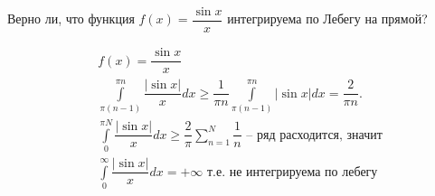 \begin{task}{3}
Верно ли, что функция $f(x) = \dfrac{\sin{x}}{x}$ интегрируема по Лебегу на прямой?
\end{task}

\begin{solution} 
\begin{align*}
    &f(x) = \dfrac{\sin{x}}{x} \\
    &\int\limits_{\pi (n-1)}^{\pi n}\dfrac{|\sin{x}|}{x}dx \geqslant \dfrac{1}{\pi n}\int\limits_{\pi (n-1)}^{\pi n}|\sin{x}|dx = \dfrac{2}{\pi n}.\\
    &\int\limits_0^{\pi N}\dfrac{|\sin{x}|}{x}dx \geqslant \dfrac{2}{\pi} \sum_{n = 1}^N\dfrac{1}{n} \text{ -- ряд расходится, значит}\\
    &\int\limits_0^\infty \dfrac{|\sin{x}|}{x}dx = +\infty \text{ т.е. не интегрируема по лебегу}
\end{align*}
\end{solution}